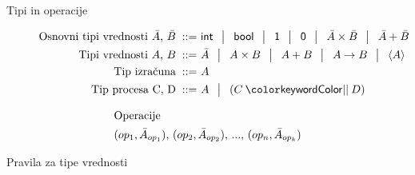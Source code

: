 \documentclass{beamer}
\theoremstyle{definition} %
\theoremstyle{plain} %
\begin{document}
	\begin{frame}{Tipi in operacije}
		\begin{figure}[tb]
			\parbox{\textwidth}{
				\centering
				\tiny
				\begin{align*}
				\text{Osnovni tipi vrednosti $\bar{A}$, $\bar{B}$}
				\bnfis & \tysym{int} \,\bnfor\! \tysym{bool} \,\bnfor\! \tyunit \,\bnfor\! \tyempty \, 
				          \bnfor\! \typrod{\bar{A}}{\bar{B}} \,\bnfor\! \tysum{\bar{A}}{\bar{B}}
				\\
				\text{Tipi vrednosti $A$, $B$}
				\bnfis & \bar{A} \, \bnfor\! \typrod{A}{B} \,\bnfor\! \tysum{A}{B} \,\bnfor\! \tyfun{A}{B} \,\bnfor\! \typromise{A}
				\\
				\text{Tip izračuna} \bnfis& \tycomp{A}
				\\
				\text{Tip procesa \tyC, \tyD}  \bnfis & \tyrun{A} \,\bnfor\! \typar{\tyC}{\tyD}
				\end{align*}
			} 
		\end{figure}
	
		\begin{figure}
			\centering
			\tiny
			\begin{align*}
			\intertext{Operacije}
			(op_1, \bar{A}_{op_1}),\, (op_2, \bar{A}_{op_2}),\, ... ,\, (op_n, \bar{A}_{op_k})
			\end{align*}
			\vspace{-15ex}
		\end{figure}
	\end{frame}

	\begin{frame}{Pravila za tipe vrednosti}
		\begin{figure}[tp]
			\centering
			\tiny
			\begin{mathpar}
				\qquad
				\qquad
				\quad
				\quad
				\coopinfer{}{
				}{
					\Gamma \types \tmunit : \tyunit
				}
				\\
				\quad
				\quad
				\quad
				\\
				\quad
			\end{mathpar}
		\end{figure}
	\end{frame}
\end{document}
